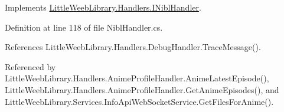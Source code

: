 Implements \mbox{\hyperlink{interface_little_weeb_library_1_1_handlers_1_1_i_nibl_handler_a751ab95fe78f072abef69d89e5557ad1}{Little\+Weeb\+Library.\+Handlers.\+I\+Nibl\+Handler}}.



Definition at line 118 of file Nibl\+Handler.\+cs.



References Little\+Weeb\+Library.\+Handlers.\+Debug\+Handler.\+Trace\+Message().



Referenced by Little\+Weeb\+Library.\+Handlers.\+Anime\+Profile\+Handler.\+Anime\+Latest\+Episode(), Little\+Weeb\+Library.\+Handlers.\+Anime\+Profile\+Handler.\+Get\+Anime\+Episodes(), and Little\+Weeb\+Library.\+Services.\+Info\+Api\+Web\+Socket\+Service.\+Get\+Files\+For\+Anime().


